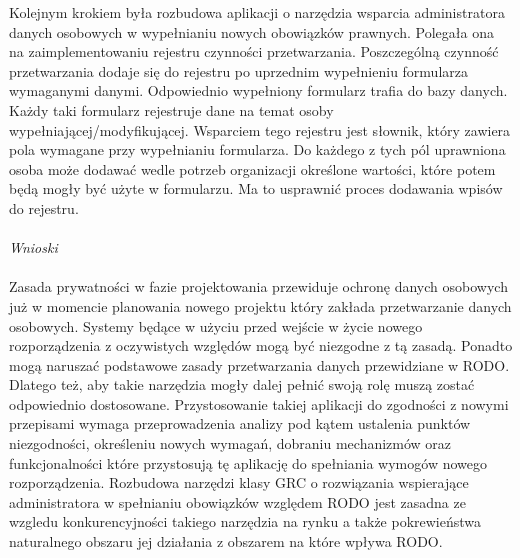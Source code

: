 \documentclass[en, noamssymb]{mgr}
\begin{document}
\indent Kolejnym krokiem była rozbudowa aplikacji o narzędzia wsparcia administratora danych osobowych w wypełnianiu nowych obowiązków prawnych. Polegała ona na zaimplementowaniu rejestru czynności przetwarzania. Poszczególną czynność przetwarzania dodaje się do rejestru po uprzednim wypełnieniu formularza wymaganymi danymi. Odpowiednio wypełniony formularz trafia do bazy danych. Każdy taki formularz rejestruje dane na temat osoby wypełniającej/modyfikującej. Wsparciem tego rejestru jest słownik, który zawiera pola wymagane przy wypełnianiu formularza. Do każdego z tych pól uprawniona osoba może dodawać wedle potrzeb organizacji określone wartości, które potem będą mogły być użyte w formularzu. Ma to usprawnić proces dodawania wpisów do rejestru.    \\ \\

\indent \textit{Wnioski} \\ \\
\indent Zasada prywatności w fazie projektowania przewiduje ochronę danych osobowych już  w momencie planowania nowego projektu który zakłada przetwarzanie danych osobowych. Systemy będące w użyciu przed wejście w życie nowego rozporządzenia z oczywistych względów mogą być niezgodne z tą zasadą. Ponadto mogą naruszać podstawowe zasady przetwarzania danych przewidziane w RODO. Dlatego też, aby takie narzędzia mogły dalej pełnić swoją rolę muszą zostać odpowiednio dostosowane. Przystosowanie takiej aplikacji do zgodności z nowymi przepisami wymaga przeprowadzenia analizy pod kątem ustalenia punktów niezgodności, określeniu nowych wymagań, dobraniu mechanizmów oraz funkcjonalności które przystosują tę aplikację do spełniania wymogów nowego rozporządzenia. Rozbudowa narzędzi klasy GRC o rozwiązania wspierające administratora w spełnianiu obowiązków względem RODO jest zasadna ze wzgledu konkurencyjności takiego narzędzia na rynku a także pokrewieństwa naturalnego obszaru jej działania z obszarem na które wpływa RODO. 


\listoffigures
\end{document}
